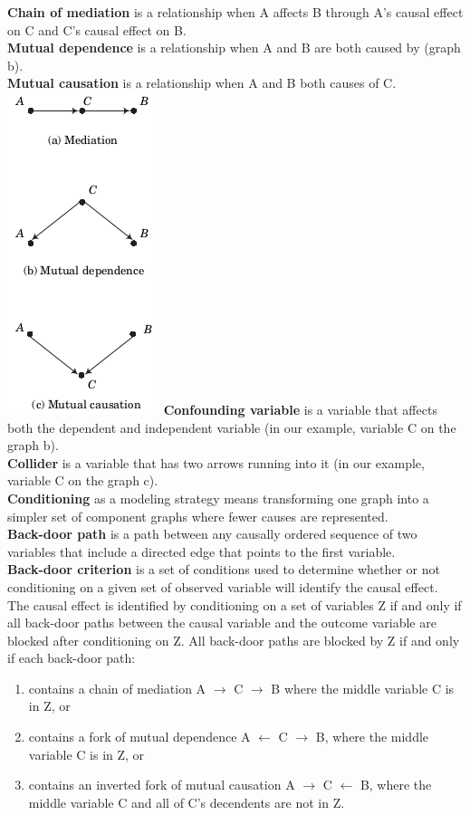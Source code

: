 \textbf{Chain of mediation} is a relationship when A affects B through A's causal effect on C and C's causal effect on B.\\
\textbf{Mutual dependence} is a relationship when A and B are both caused by  (graph b).\\
\textbf{Mutual causation} is a relationship when A and B both causes of C. \\
\includegraphics[trim=0 -1cm 0 -1cm, center]{../material/fig-graph-basic-causal-relationships.png}
\textbf{Confounding variable} is a variable that affects both the dependent and independent variable (in our example, variable C on the graph b).\\
\textbf{Collider} is a variable that has two arrows running into it (in our example, variable C on the graph c).\\
\textbf{Conditioning} as a modeling strategy means transforming one graph into a simpler set of component graphs where fewer causes are represented.\\
\textbf{Back-door path} is a path between any causally ordered sequence  of two variables that include a directed edge that points to the first variable. \\
\textbf{Back-door criterion} is a set of conditions used to determine whether or not conditioning on a given set of observed variable will identify the causal effect. The causal effect is identified by conditioning on a set of variables Z if and only if all back-door paths between the causal variable and the outcome variable are blocked after conditioning on Z. All back-door paths are blocked by Z if and only if each back-door path:
\begin{enumerate}
\item contains a chain of mediation A $\rightarrow$ C $\rightarrow$  B where the middle variable C is in Z, or
\item contains a fork of mutual dependence A $\leftarrow$ C $\rightarrow$ B, where the middle variable C is in Z, or
\item contains an inverted fork of mutual causation A $\rightarrow$ C $\leftarrow$  B, where the middle variable C and all of C's decendents are not in Z.
\end{enumerate}

\nocite{Morgan.2014}
\nocite{Pearl.2009}





